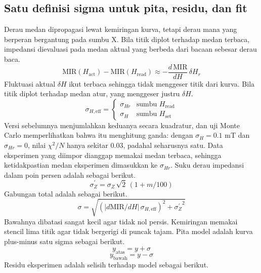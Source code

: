 \documentclass[a4paper,11pt]{article}
\begin{document}
\subsection{Satu definisi sigma untuk pita, residu, dan fit}
Derau medan dipropagasi lewat kemiringan kurva, tetapi derau mana yang
berperan bergantung pada sumbu X. Bila titik diplot terhadap medan terbaca,
impedansi dievaluasi pada medan aktual yang berbeda dari bacaan sebesar derau baca.
\begin{equation*}
\mathrm{MIR}(H_{\mathrm{act}})-\mathrm{MIR}(H_{\mathrm{read}})
\approx -\frac{d\,\mathrm{MIR}}{dH}\,\delta H_{r}
\end{equation*}
Fluktuasi aktual $\delta H$ ikut terbaca sehingga tidak menggeser titik dari kurva.
Bila titik diplot terhadap medan atur, yang menggeser justru $\delta H$.
\begin{equation*}
\sigma_{H,\mathrm{eff}} =
\begin{cases}
\sigma_{Hr} & \text{sumbu } H_{\mathrm{read}}\\
\sigma_{H} & \text{sumbu } H_{\mathrm{set}}
\end{cases}
\end{equation*}
Versi sebelumnya menjumlahkan keduanya secara kuadratur, dan uji Monte Carlo
memperlihatkan bahwa itu menghitung ganda: dengan $\sigma_{H}=0.1$ mT dan
$\sigma_{Hr}=0$, nilai $\chi^{2}/N$ hanya sekitar $0.03$, padahal seharusnya satu.
Data eksperimen yang diimpor dianggap memakai medan terbaca, sehingga
ketidakpastian medan eksperimen dimasukkan ke $\sigma_{Hr}$.
Suku derau impedansi dalam poin persen adalah sebagai berikut.
\begin{equation*}
\sigma_{Z}^{\prime} = \sigma_{Z}\,\sqrt{2}\,(1+m/100)
\end{equation*}
Gabungan total adalah sebagai berikut.
\begin{equation*}
\sigma = \sqrt{(|d\mathrm{MIR}/dH|\,\sigma_{H,\mathrm{eff}})^{2}
+{\sigma_{Z}^{\prime}}^{2}}
\end{equation*}
Bawahnya dibatasi sangat kecil agar tidak nol persis.
Kemiringan memakai stencil lima titik agar tidak bergerigi di puncak tajam.
Pita model adalah kurva plus-minus satu sigma sebagai berikut.
\begin{equation*}
y_{\mathrm{atas}} = y+\sigma
\end{equation*}
\begin{equation*}
y_{\mathrm{bawah}} = y-\sigma
\end{equation*}
Residu eksperimen adalah selisih terhadap model sebagai berikut.
\end{document}
